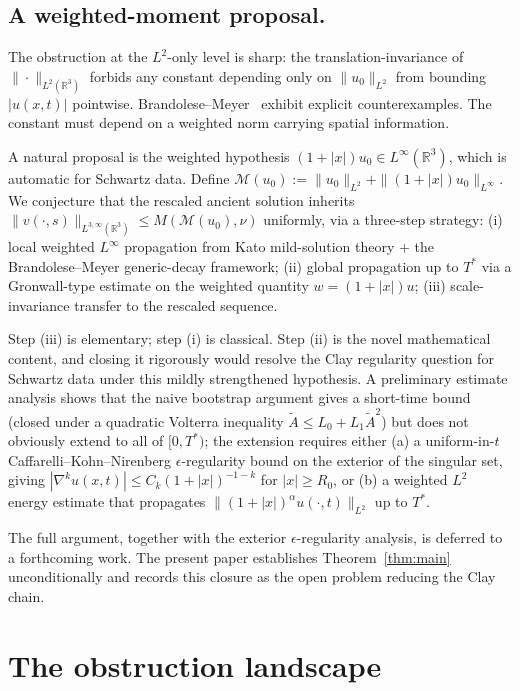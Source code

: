 \documentclass[11pt]{amsart}
\theoremstyle{definition}
\newcommand{\RR}{\mathbb{R}}
\newcommand{\Lweak}[1]{L^{3,\infty}(\RR^{#1})}
\newcommand{\norm}[1]{\|#1\|}
\newcommand{\abs}[1]{|#1|}
\begin{document}
\subsection{A weighted-moment proposal.}\label{ssec:weighted-moment}

The obstruction at the $L^2$-only level is sharp: the
translation-invariance of $\norm{\cdot}_{L^2(\RR^3)}$ forbids any
constant depending only on $\norm{u_0}_{L^2}$ from bounding
$\abs{u(x, t)}$ pointwise. Brandolese--Meyer~\cite{BrandoleseMeyer}
exhibit explicit counterexamples. The constant must depend on a
weighted norm carrying spatial information.

A natural proposal is the weighted hypothesis
$(1 + \abs{x}) u_0 \in L^\infty(\RR^3)$, which is automatic for
Schwartz data. Define $\mathcal{M}(u_0) := \norm{u_0}_{L^2} +
\norm{(1 + \abs{x}) u_0}_{L^\infty}$. We conjecture that the
rescaled ancient solution inherits
$\norm{v(\cdot, s)}_{\Lweak{3}} \leq M(\mathcal{M}(u_0), \nu)$
uniformly, via a three-step strategy: (i) local weighted
$L^\infty$ propagation from Kato mild-solution theory + the
Brandolese--Meyer generic-decay framework; (ii) global
propagation up to $T^*$ via a Gronwall-type estimate on the
weighted quantity $w = (1 + \abs{x}) u$; (iii) scale-invariance
transfer to the rescaled sequence.

Step (iii) is elementary; step (i) is classical. Step (ii) is
the novel mathematical content, and closing it rigorously would
resolve the Clay regularity question for Schwartz data under this
mildly strengthened hypothesis. A preliminary estimate analysis
\cite[desk/04]{CompanionCorpus} shows that the naive bootstrap
argument gives a short-time bound (closed under a quadratic
Volterra inequality $\tilde A \leq L_0 + L_1 \tilde A^2$) but
does not obviously extend to all of $[0, T^*)$; the extension
requires either (a) a uniform-in-$t$ Caffarelli--Kohn--Nirenberg
$\epsilon$-regularity bound on the exterior of the singular set,
giving $\abs{\nabla^k u(x, t)} \leq C_k(1 + \abs{x})^{-1-k}$ for
$\abs{x} \geq R_0$, or (b) a weighted $L^2$ energy estimate that
propagates $\norm{(1 + \abs{x})^\alpha u(\cdot, t)}_{L^2}$ up to
$T^*$.

The full argument, together with the exterior
$\epsilon$-regularity analysis, is deferred to a forthcoming
work. The present paper establishes Theorem~\ref{thm:main}
unconditionally and records this closure as the open problem
reducing the Clay chain.

\section{The obstruction landscape}\label{sec:obstructions}
\end{document}
